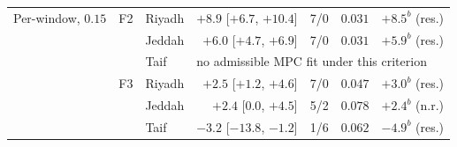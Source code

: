 \begin{table}[!ht]
\begin{tabularx}{\textwidth}{@{}llXrrrr@{}}
Per-window, $0.15$ & F2 & Riyadh & $+8.9$ [$+6.7$, $+10.4$] & 7/0 & $0.031$ & $+8.5^{b}$ (res.) \\
 &  & Jeddah & $+6.0$ [$+4.7$, $+6.9$] & 7/0 & $0.031$ & $+5.9^{b}$ (res.) \\
 &  & Taif & \multicolumn{4}{l}{no admissible MPC fit under this criterion} \\
 & F3 & Riyadh & $+2.5$ [$+1.2$, $+4.6$] & 7/0 & $0.047$ & $+3.0^{b}$ (res.) \\
 &  & Jeddah & $+2.4$ [$0.0$, $+4.5$] & 5/2 & $0.078$ & $+2.4^{b}$ (n.r.) \\
 &  & Taif & $-3.2$ [$-13.8$, $-1.2$] & 1/6 & $0.062$ & $-4.9^{b}$ (res.) \\
\bottomrule
\end{tabularx}
\end{table}
